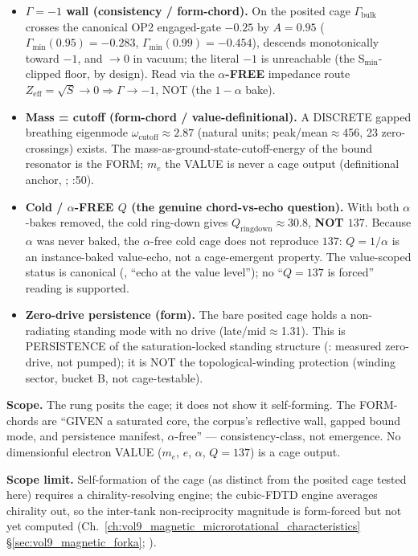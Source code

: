\begin{itemize}
    \item \textbf{$\Gamma=-1$\gammaundeclared{} wall (consistency / form-chord).} On the posited cage $\Gamma_\text{bulk}$ crosses the canonical OP2 engaged-gate $-0.25$ by $A=0.95$ ($\Gamma_\text{min}(0.95)=-0.283$, $\Gamma_\text{min}(0.99)=-0.454$), descends monotonically toward $-1$, and $\to0$ in vacuum; the literal $-1$ is unreachable (the S$_\text{min}$-clipped floor, by design). Read via the \textbf{$\alpha$-FREE} impedance route $Z_\text{eff}=\sqrt{S}\to0\Rightarrow\Gamma\to-1$\gammaundeclared{}, NOT  (the $1-\alpha$ bake).
    \item \textbf{Mass = cutoff (form-chord / value-definitional).} A DISCRETE gapped breathing eigenmode $\omega_\text{cutoff}\approx2.87$ (natural units; peak/mean$\approx$456, 23 zero-crossings) exists. The mass-as-ground-state-cutoff-energy of the bound resonator is the FORM; $m_e$ the VALUE is never a cage output (definitional anchor, ; :50).
    \item \textbf{Cold / $\alpha$-FREE $Q$ (the genuine chord-vs-echo question).} With both $\alpha$-bakes removed, the cold ring-down gives $Q_\text{ringdown}\approx30.8$, \textbf{NOT $137$}. Because $\alpha$ was never baked, the $\alpha$-free cold cage does not reproduce $137$: $Q=1/\alpha$ is an instance-baked value-echo, not a cage-emergent property. The value-scoped status is canonical (, ``echo at the value level''); no ``$Q=137$ is forced'' reading is supported.
    \item \textbf{Zero-drive persistence (form).} The bare posited cage holds a non-radiating standing mode with no drive (late/mid$\approx$1.31). This is PERSISTENCE of the saturation-locked standing structure (: measured zero-drive, not pumped); it is NOT the topological-winding protection (winding sector, bucket B, not cage-testable).
\end{itemize}

\noindent
\textbf{Scope.} The rung posits the cage; it does not show it self-forming. The FORM-chords are ``GIVEN a saturated core, the corpus's reflective wall, gapped bound mode, and persistence manifest, $\alpha$-free'' --- consistency-class, not emergence. No dimensionful electron VALUE ($m_e$, $e$, $\alpha$, $Q=137$) is a cage output.

\noindent
\textbf{Scope limit.} Self-formation of the cage (as distinct from the posited cage tested here) requires a chirality-resolving engine; the cubic-FDTD engine averages chirality out, so the inter-tank non-reciprocity magnitude is form-forced but not yet computed (Ch.~\ref{ch:vol9_magnetic_microrotational_characteristics} \S\ref{sec:vol9_magnetic_forka}; ).

